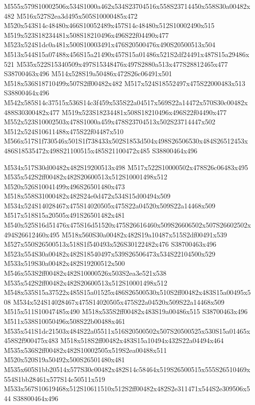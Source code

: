 \documentclass{article}
\begin{document}
\begin{multicols}{2}
M555x579S10002506x534S1000a462x534S23704516x558S23714450x558S30a00482x482 M516x527S2ea3d495x505S10000485x472 M520x543S14c48480x466S10052489x457S14c48480x512S10002490x515 M519x523S18234481x508S18210496x496S22f04490x477 M523x524S1dc0a481x500S10003491x476S20500476x490S20500513x504 M513x544S15a07488x456S15a21490x457S15a01486x521S2df24491x487S15a29486x521 M535x522S15340509x497S15348476x497S2880a513x477S28812465x477 S38700463x496 M514x528S19a50486x472S26c06491x501 M518x536S18710499x507S2ff00482x482 M517x524S18552497x475S22000483x513 S38800464x496 M542x585S14c37515x536S14c3f459x535S22a04517x569S22a14472x570S30c00482x488S30300482x477 M519x523S18234481x508S18210496x496S22f04490x477 M552x523S10002503x478S1000a459x478S23704513x502S23714447x502 M512x524S10611488x475S22f04487x510 M566x517S1f730546x501S1f738433x502S1853d504x498S26506530x484S26512453x486S18535472x498S21100515x485S21100472x485 S38800464x496

M534x517S30d00482x482S19200513x498 M517x522S10000502x478S26c06483x495 M535x542S2ff00482x482S20600513x512S10001498x512 M520x526S10041499x496S26501480x473 M518x558S31000482x482S24e0d472x534S15d00494x509 M534x524S14028467x475S14020505x475S22a04520x509S22a14468x509 M517x518S15a20505x491S26501482x481 M540x525S16d51476x475S16d51520x475S26616460x509S26606502x507S26602502x494S26612460x495 M518x560S30a00482x482S19a10487x515S2df00491x539 M527x550S26500513x518S1f540493x526S30122482x476 S38700463x496 M523x554S30a00482x482S18540497x539S26506473x534S22104500x529 M533x519S30a00482x482S19200512x500 M546x553S2ff00482x482S10000526x503S2ea3e521x538 M535x542S2ff00482x482S20600513x512S10001498x512 M548x535S15a37522x485S15a01525x486S26500530x510S2ff00482x483S15a00495x508 M534x524S14028467x475S14020505x475S22a04520x509S22a14468x509 M515x511S10047485x490 M518x535S2ff00482x483S19a00486x515 S38700463x496 M511x538S10050496x508S22b00488x461 M535x541S1dc21503x484S22a05511x516S20500502x507S20500525x530S15a01465x458S2f900475x483 M518x518S2ff00482x483S15a10494x432S22a04494x464 M535x536S2ff00482x482S10002505x519S2ea00488x511 M520x520S19a50492x500S26501480x481 M535x605S1bb20514x577S30c00482x482S14c58464x519S26500515x555S26510469x554S1bb28461x577S14c50511x519 M533x567S10619468x512S10611510x512S2ff00482x482S2e311471x544S2e309506x544 S38800464x496


\end{multicols}
\end{document}
